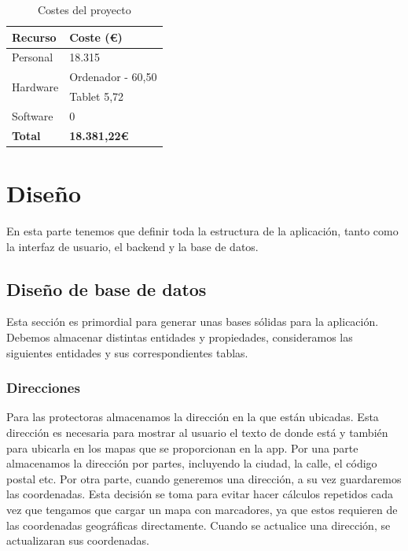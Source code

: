 \documentclass[a4paper, 12pt]{article}
\begin{document}
\begin{table}[H]
    \centering
    \begin{tabular}{ | m{5cm} | m{5cm} | }
	    \hline \textbf{Recurso} & \textbf{Coste (€)} \\ \hline
	    	Personal & 18.315 \\ \hline
	    	\multirow{2}{*}{Hardware} & Ordenador - 60,50 \\& Tablet 5,72 \\ \hline
	    	Software & 0 \\ \hline
	    \textbf{Total} & \textbf{18.381,22€} \\ \hline
    \end{tabular}
    \caption{Costes del proyecto}
    \label{tab:costes}
\end{table}

\newpage
\section{Diseño}

En esta parte tenemos que definir toda la estructura de la aplicación, tanto como la interfaz de usuario, el backend y la base de datos.

\subsection{Diseño de base de datos}

Esta sección es primordial para generar unas bases sólidas para la aplicación. Debemos almacenar distintas entidades y propiedades, consideramos las siguientes entidades y sus correspondientes tablas.

\subsubsection{Direcciones}

Para las protectoras almacenamos la dirección en la que están ubicadas. Esta dirección es necesaria para mostrar al usuario el texto de donde está y también para ubicarla en los mapas que se proporcionan en la app. Por una parte almacenamos la dirección por partes, incluyendo la ciudad, la calle, el código postal etc. Por otra parte, cuando generemos una dirección, a su vez guardaremos las coordenadas. Esta decisión se toma para evitar hacer cálculos repetidos cada vez que tengamos que cargar un mapa con marcadores, ya que estos requieren de las coordenadas geográficas directamente. Cuando se actualice una dirección, se actualizaran sus coordenadas.
\end{document}
